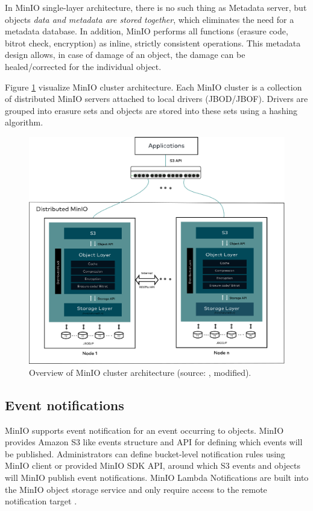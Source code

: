     In MinIO single-layer architecture, there is no such thing as Metadata server, but objects \textit{data and metadata are stored together}, which eliminates the need for a metadata database. In addition, MinIO performs all functions (erasure code, bitrot check, encryption) as inline, strictly consistent operations. This metadata design allows, in case of damage of an object, the damage can be healed/corrected for the individual object\cite{minioHighPerformance}.

    Figure \ref{fig:minio-architecture} visualize MinIO cluster architecture. Each MinIO cluster is a collection of distributed MinIO servers attached to local drivers (JBOD/JBOF). Drivers are grouped into erasure sets and objects are stored into these sets using a hashing algorithm\cite{minioObjectStorage}.

    \begin{figure}[H]
        \centering
        \includegraphics[angle=90, height=0.75\textheight]{obrazky-figures/minio-architecture.eps}
        \caption{Overview of MinIO cluster architecture (source: \cite{minioObjectStorage}, modified).}
        \label{fig:minio-architecture}
    \end{figure}
    \newpage


    \subsection{Event notifications}
    MinIO supports event notification for an event occurring to objects. MinIO provides Amazon S3 like events structure and API for defining which events will be published. Administrators can define bucket-level notification rules using MinIO client or provided MinIO SDK API, around which S3 events and objects will MinIO publish event notifications. MinIO Lambda Notifications are built into the MinIO object storage service and only require access to the remote notification target \cite{minioMonitoring}.


